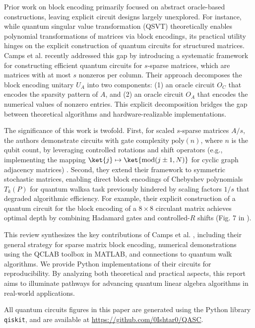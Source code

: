 \documentclass{article}
\begin{document}
Prior work on block encoding primarily focused on abstract oracle-based constructions, leaving explicit circuit designs largely unexplored. For instance, while quantum singular value transformation (QSVT) \cite{Gilyen2019} theoretically enables polynomial transformations of matrices via block encodings, its practical utility hinges on the explicit construction of quantum circuits for structured matrices. Camps et al. \cite{EQC} recently addressed this gap by introducing a systematic framework for constructing efficient quantum circuits for $s$-sparse matrices, which are matrices with at most $s$ nonzeros per column. Their approach decomposes the block encoding unitary $U_A$ into two components: (1) an oracle circuit $O_C$ that encodes the sparsity pattern of $A$, and (2) an oracle circuit $O_A$ that encodes the numerical values of nonzero entries. This explicit decomposition bridges the gap between theoretical algorithms and hardware-realizable implementations.

The significance of this work is twofold. First, for scaled $s$-sparse matrices $A/s$, the authors demonstrate circuits with gate complexity $\text{poly}(n)$, where $n$ is the qubit count, by leveraging controlled rotations and shift operators (e.g., implementing the mapping $\ket{j} \mapsto \ket{\text{mod}(j \pm 1, N)}$ for cyclic graph adjacency matrices) \cite{EQC}. Second, they extend their framework to symmetric stochastic matrices, enabling direct block encodings of Chebyshev polynomials $T_k(P)$ for quantum walks\textemdash a task previously hindered by scaling factors $1/s$ that degraded algorithmic efficiency. For example, their explicit construction of a quantum circuit for the block encoding of a $8 \times 8$ circulant matrix achieves optimal depth by combining Hadamard gates and controlled-$R$ shifts (Fig. 7 in \cite{EQC}).

This review synthesizes the key contributions of Camps et al. \cite{EQC}, including their general strategy for sparse matrix block encoding, numerical demonstrations using the QCLAB toolbox in MATLAB, and connections to quantum walk algorithms. We provide Python implementations of their circuits for reproducibility. By analyzing both theoretical and practical aspects, this report aims to illuminate pathways for advancing quantum linear algebra algorithms in real-world applications.

All quantum circuits figures in this paper are generated using the Python library \texttt{qiskit}, and are available at \url{https://github.com/0Ishtar0/QASC}.
\end{document}

